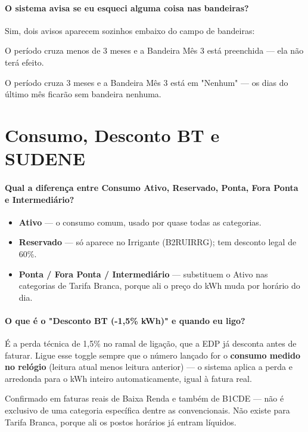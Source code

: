 \documentclass[11pt,a4paper]{article}
\begin{document}
\paragraph{O sistema avisa se eu esqueci alguma coisa nas bandeiras?}
Sim, dois avisos aparecem sozinhos embaixo do campo de bandeiras:

\begin{tipbox}
O período cruza menos de 3 meses e a Bandeira Mês 3 está preenchida --- ela não terá efeito.
\end{tipbox}
\begin{warnbox}
O período cruza 3 meses e a Bandeira Mês 3 está em "Nenhum" --- os dias do último mês ficarão sem bandeira nenhuma.
\end{warnbox}

\section{Consumo, Desconto BT e SUDENE}

\paragraph{Qual a diferença entre Consumo Ativo, Reservado, Ponta, Fora Ponta e Intermediário?}
\begin{itemize}
  \item \textbf{Ativo} --- o consumo comum, usado por quase todas as categorias.
  \item \textbf{Reservado} --- só aparece no Irrigante (B2RUIRRG); tem desconto legal de 60\%.
  \item \textbf{Ponta / Fora Ponta / Intermediário} --- substituem o Ativo nas categorias de Tarifa Branca, porque ali o preço do kWh muda por horário do dia.
\end{itemize}

\paragraph{O que é o "Desconto BT (-1,5\% kWh)" e quando eu ligo?}
É a perda técnica de 1,5\% no ramal de ligação, que a EDP já desconta antes de faturar. Ligue esse toggle sempre que o número lançado for o \textbf{consumo medido no relógio} (leitura atual menos leitura anterior) --- o sistema aplica a perda e arredonda para o kWh inteiro automaticamente, igual à fatura real.

Confirmado em faturas reais de Baixa Renda e também de B1CDE --- não é exclusivo de uma categoria específica dentre as convencionais. Não existe para Tarifa Branca, porque ali os postos horários já entram líquidos.
\end{document}
